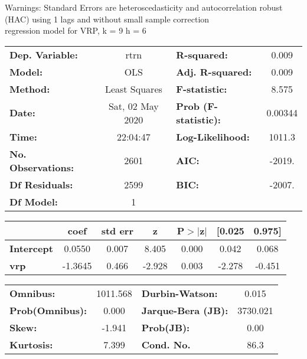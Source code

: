 Warnings: \newline
 [1] Standard Errors are heteroscedasticity and autocorrelation robust (HAC) using 1 lags and without small sample correction\\ 

regression model for VRP, k = 9 h = 6\begin{center}
\begin{tabular}{lclc}
\toprule
\textbf{Dep. Variable:}    &       rtrn       & \textbf{  R-squared:         } &     0.009   \\
\textbf{Model:}            &       OLS        & \textbf{  Adj. R-squared:    } &     0.009   \\
\textbf{Method:}           &  Least Squares   & \textbf{  F-statistic:       } &     8.575   \\
\textbf{Date:}             & Sat, 02 May 2020 & \textbf{  Prob (F-statistic):} &  0.00344    \\
\textbf{Time:}             &     22:04:47     & \textbf{  Log-Likelihood:    } &    1011.3   \\
\textbf{No. Observations:} &        2601      & \textbf{  AIC:               } &    -2019.   \\
\textbf{Df Residuals:}     &        2599      & \textbf{  BIC:               } &    -2007.   \\
\textbf{Df Model:}         &           1      & \textbf{                     } &             \\
\bottomrule
\end{tabular}
\begin{tabular}{lcccccc}
                   & \textbf{coef} & \textbf{std err} & \textbf{z} & \textbf{P$> |$z$|$} & \textbf{[0.025} & \textbf{0.975]}  \\
\midrule
\textbf{Intercept} &       0.0550  &        0.007     &     8.405  &         0.000        &        0.042    &        0.068     \\
\textbf{vrp}       &      -1.3645  &        0.466     &    -2.928  &         0.003        &       -2.278    &       -0.451     \\
\bottomrule
\end{tabular}
\begin{tabular}{lclc}
\textbf{Omnibus:}       & 1011.568 & \textbf{  Durbin-Watson:     } &    0.015  \\
\textbf{Prob(Omnibus):} &   0.000  & \textbf{  Jarque-Bera (JB):  } & 3730.021  \\
\textbf{Skew:}          &  -1.941  & \textbf{  Prob(JB):          } &     0.00  \\
\textbf{Kurtosis:}      &   7.399  & \textbf{  Cond. No.          } &     86.3  \\
\bottomrule
\end{tabular}
\end{center}

